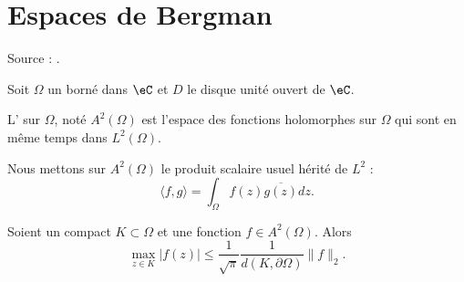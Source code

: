 \section{Espaces de Bergman}

Source : \cite{ytMOpe}.

Soit \( \Omega\) un borné dans \( \eC\) et \( D\) le disque unité ouvert de \( \eC\).

\begin{definition}
    L' sur \( \Omega\), noté \( A^2(\Omega)\) est l'espace des fonctions holomorphes sur \( \Omega\) qui sont en même temps dans \( L^2(\Omega)\).
\end{definition}
Nous mettons sur \( A^2(\Omega)\) le produit scalaire usuel hérité de \( L^2\) :
\begin{equation}
    \langle f, g\rangle =\int_{\Omega}f(z)\overline{ g(z) }dz.
\end{equation}

\begin{lemma}   \label{LemIZxKfB}
    Soient un compact \( K\subset \Omega\) et une fonction \( f\in A^2(\Omega)\). Alors
    \begin{equation}
        \max_{z\in K}| f(z) |\leq \frac{1}{ \sqrt{\pi} }\frac{1}{ d(K,\partial \Omega) }\| f \|_2.
    \end{equation}
\end{lemma}

